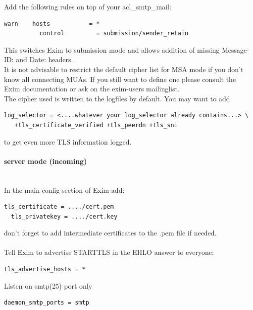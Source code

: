 Add the following rules on top of your acl\_smtp\_mail:
\begin{lstlisting}[breaklines]
  warn    hosts           = *
          control         = submission/sender_retain
\end{lstlisting}
This switches Exim to submission mode and allows addition of missing Message-ID: and Date: headers.\\

It is not advisable to restrict the default cipher list for MSA mode if you don't know all connecting MUAs. If you still want to define one please consult the Exim documentation or ask on the exim-users mailinglist.\\

The cipher used is written to the logfiles by default. You may want to add
\begin{lstlisting}[breaklines]
  log_selector = <....whatever your log_selector already contains...> \
   +tls_certificate_verified +tls_peerdn +tls_sni
\end{lstlisting}
to get even more TLS information logged.


\paragraph*{server mode (incoming)}\mbox{}\\

In the main config section of Exim add:

\begin{lstlisting}[breaklines]
  tls_certificate = ..../cert.pem
  tls_privatekey = ..../cert.key
\end{lstlisting}
don't forget to add intermediate certificates to the .pem file if needed.\\
\\
Tell Exim to advertise STARTTLS in the EHLO answer to everyone:
\begin{lstlisting}[breaklines]
  tls_advertise_hosts = *
\end{lstlisting}

Listen on smtp(25) port only
\begin{lstlisting}[breaklines]
  daemon_smtp_ports = smtp
\end{lstlisting}

